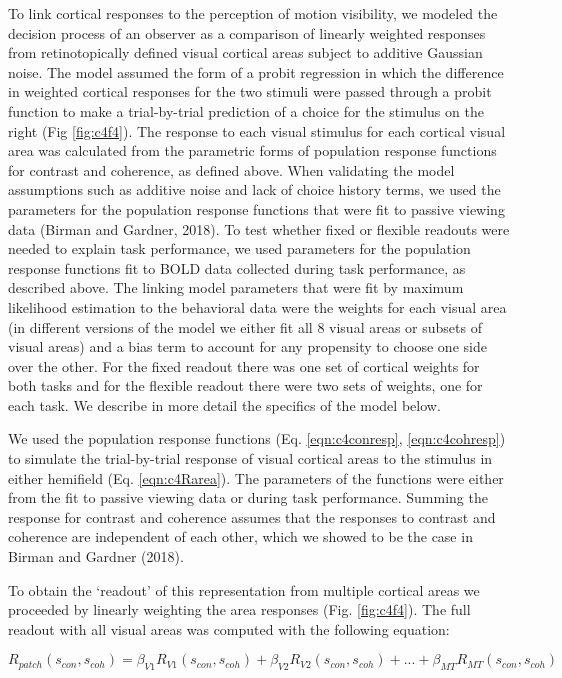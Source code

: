\documentclass{report}
\begin{document}
To link cortical responses to the perception of motion visibility, we modeled the decision process of an observer as a comparison of linearly weighted responses from retinotopically defined visual cortical areas subject to additive Gaussian noise. The model assumed the form of a probit regression in which the difference in weighted cortical responses for the two stimuli were passed through a probit function to make a trial-by-trial prediction of a choice for the stimulus on the right (Fig \ref{fig:c4f4}). The response to each visual stimulus for each cortical visual area was calculated from the parametric forms of population response functions for contrast and coherence, as defined above. When validating the model assumptions such as additive noise and lack of choice history terms, we used the parameters for the population response functions that were fit to passive viewing data (Birman and Gardner, 2018). To test whether fixed or flexible readouts were needed to explain task performance, we used parameters for the population response functions fit to BOLD data collected during task performance, as described above. The linking model parameters that were fit by maximum likelihood estimation to the behavioral data were the weights for each visual area (in different versions of the model we either fit all 8 visual areas or subsets of visual areas) and a bias term to account for any propensity to choose one side over the other. For the fixed readout there was one set of cortical weights for both tasks and for the flexible readout there were two sets of weights, one for each task. We describe in more detail the specifics of the model below.

We used the population response functions (Eq. \ref{eqn:c4conresp}, \ref{eqn:c4cohresp}) to simulate the trial-by-trial response of visual cortical areas to the stimulus in either hemifield (Eq. \ref{eqn:c4Rarea}). The parameters of the functions were either from the fit to passive viewing data or during task performance. Summing the response for contrast and coherence assumes that the responses to contrast and coherence are independent of each other, which we showed to be the case in Birman and Gardner (2018).

To obtain the `readout' of this representation from multiple cortical areas we proceeded by linearly weighting the area responses (Fig. \ref{fig:c4f4}). The full readout with all visual areas was computed with the following equation:

\begin{equation}
    R_{patch}(s_{con},s_{coh})=\beta_{V1}R_{V1}(s_{con},s_{coh})+\beta_{V2}R_{V2}(s_{con},s_{coh})+...+\beta_{MT}R_{MT}(s_{con},s_{coh})
    \label{eqn:c4r_patch}
\end{equation}
\end{document}
